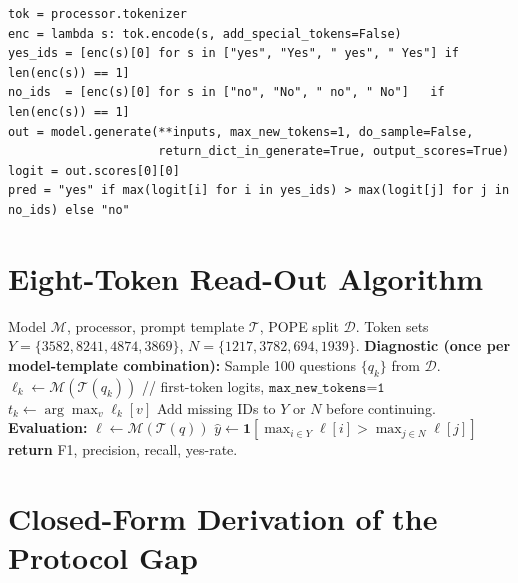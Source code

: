 \documentclass{article}
\begin{document}
\begin{lstlisting}[caption={Drop-in POPE answer readout. Derive the
yes/no token IDs from the model's own tokenizer, then compare
first-token max-logits. Runs unchanged across tokenizer families.},
label={lst:snippet}]
tok = processor.tokenizer
enc = lambda s: tok.encode(s, add_special_tokens=False)
yes_ids = [enc(s)[0] for s in ["yes", "Yes", " yes", " Yes"] if len(enc(s)) == 1]
no_ids  = [enc(s)[0] for s in ["no", "No", " no", " No"]   if len(enc(s)) == 1]
out = model.generate(**inputs, max_new_tokens=1, do_sample=False,
                     return_dict_in_generate=True, output_scores=True)
logit = out.scores[0][0]
pred = "yes" if max(logit[i] for i in yes_ids) > max(logit[j] for j in no_ids) else "no"
\end{lstlisting}

\section{Eight-Token Read-Out Algorithm}
\label{app:algorithm}

\begin{algorithm}[h]
\caption{Eight-token POPE read-out with new-model diagnostic.}
\label{alg:eight-token}
\begin{algorithmic}[1]
\REQUIRE Model $\mathcal{M}$, processor, prompt template $\mathcal{T}$, POPE split $\mathcal{D}$.
\REQUIRE Token sets $Y = \{3582, 8241, 4874, 3869\}$, $N = \{1217, 3782, 694, 1939\}$.
\STATE \textbf{Diagnostic (once per model-template combination):}
\STATE Sample 100 questions $\{q_k\}$ from $\mathcal{D}$.
  \STATE $\boldsymbol{\ell}_k \gets \mathcal{M}(\mathcal{T}(q_k))$ \quad // first-token logits, $\texttt{max\_new\_tokens=1}$
  \STATE $t_k \gets \arg\max_v \boldsymbol{\ell}_k[v]$
\ENDFOR
{}
  \STATE Add missing IDs to $Y$ or $N$ before continuing.
\ENDIF
\STATE \textbf{Evaluation:}
  \STATE $\boldsymbol{\ell} \gets \mathcal{M}(\mathcal{T}(q))$
  \STATE $\hat{y} \gets \mathbf{1}\!\left[\max_{i \in Y} \boldsymbol{\ell}[i] > \max_{j \in N} \boldsymbol{\ell}[j]\right]$
\ENDFOR
\STATE \textbf{return} F1, precision, recall, yes-rate.
\end{algorithmic}
\end{algorithm}

\section{Closed-Form Derivation of the Protocol Gap}
\label{app:arithmetic}
\end{document}
